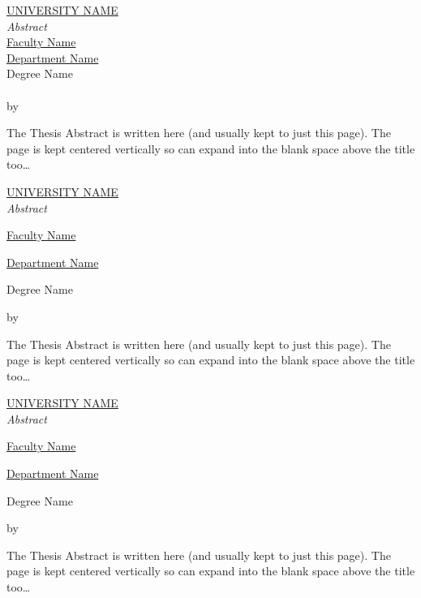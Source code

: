 \cleardoublepage
\thispagestyle{plain}
\null
\vfill
\begin{center}
  \makeatletter
  \MakeUppercase{\href{https://href.com}{University Name}} \\
  \bigskip
  {\huge\itshape Abstract} \\
  \bigskip
  \href{https://href.com}{Faculty Name} \\
  \href{https://href.com}{Department Name} \\
  \bigskip
  Degree Name \\
  \bigskip
  \textbf{\@title} \\
  \medskip
  by \@author \\
  \bigskip
  \makeatother
\end{center}
{\small The Thesis Abstract is written here (and usually kept to just this
  page). The page is kept centered vertically so can expand into the blank space
  above the title too\ldots}
\vfill
\null


\cleardoublepage
\thispagestyle{plain}
\null
\vfill
\begin{otherlanguage}{spanish}
  \centering
  \makeatletter
  \MakeUppercase{\href{https://href.com}{University Name}} \\
  \bigskip
  \huge{\textit{Abstract}} \\
  \bigskip
  {\normalsize \href{https://href.com}{Faculty Name} \par}
  {\normalsize \href{https://href.com}{Department Name} \par}
  \bigskip
  {\normalsize Degree Name \par}
  \bigskip
  {\normalsize\bfseries \@title \par}
  \medskip
  {\normalsize by \@author \par}
  \bigskip
  \makeatother
  \small{The Thesis Abstract is written here (and usually kept to just this
    page). The page is kept centered vertically so can expand into the blank space
    above the title too\ldots}
\end{otherlanguage}
\vfill
\null


\cleardoublepage
\thispagestyle{plain}
\null
\vfill
\begin{otherlanguage}{catalan}
  \centering
  \makeatletter
  \MakeUppercase{\href{https://href.com}{University Name}} \\
  \bigskip
  \huge{\textit{Abstract}} \\
  \bigskip
  {\normalsize \href{https://href.com}{Faculty Name} \par}
  {\normalsize \href{https://href.com}{Department Name} \par}
  \bigskip
  {\normalsize Degree Name \par}
  \bigskip
  {\normalsize\bfseries \@title \par}
  \medskip
  {\normalsize by \@author \par}
  \bigskip
  \makeatother
  \small{The Thesis Abstract is written here (and usually kept to just this
    page). The page is kept centered vertically so can expand into the blank space
    above the title too\ldots}
\end{otherlanguage}
\vfill
\null


